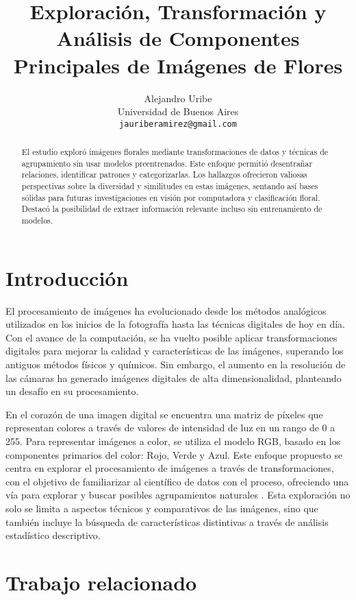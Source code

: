 \documentclass{article}
\title{Exploración, Transformación y Análisis de Componentes Principales de Imágenes de Flores}
\author{
  Alejandro Uribe\\
  Universidad de Buenos Aires\\
  \texttt{jauriberamirez@gmail.com}
}
\begin{document}
\maketitle


\begin{abstract}
  El estudio exploró imágenes florales mediante transformaciones de datos y técnicas de agrupamiento sin usar modelos preentrenados. Este enfoque permitió desentrañar relaciones, identificar patrones y categorizarlas. Los hallazgos ofrecieron valiosas perspectivas sobre la diversidad y similitudes en estas imágenes, sentando así bases sólidas para futuras investigaciones en visión por computadora y clasificación floral. Destacó la posibilidad de extraer información relevante incluso sin entrenamiento de modelos.
\end{abstract}


\section{Introducción}

El procesamiento de imágenes ha evolucionado desde los métodos analógicos utilizados en los inicios de la fotografía hasta las técnicas digitales de hoy en día. Con el avance de la computación, se ha vuelto posible aplicar transformaciones digitales para mejorar la calidad y características de las imágenes, superando los antiguos métodos físicos y químicos. Sin embargo, el aumento en la resolución de las cámaras ha generado imágenes digitales de alta dimensionalidad, planteando un desafío en su procesamiento.

En el corazón de una imagen digital se encuentra una matriz de píxeles que representan colores a través de valores de intensidad de luz en un rango de 0 a 255. Para representar imágenes a color, se utiliza el modelo RGB, basado en los componentes primarios del color: Rojo, Verde y Azul. Este enfoque propuesto se centra en explorar el procesamiento de imágenes a través de transformaciones, con el objetivo de familiarizar al científico de datos con el proceso, ofreciendo una vía para explorar y buscar posibles agrupamientos naturales \cite{HandsonML}. Esta exploración no solo se limita a aspectos técnicos y comparativos de las imágenes, sino que también incluye la búsqueda de características distintivas a través de análisis estadístico descriptivo.

\section{Trabajo relacionado}
\end{document}
